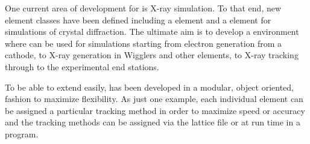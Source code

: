 One current area of development for \bmad is X-ray simulation. To that end, new element classes have
been defined including a  element and a  element for simulations of crystal
diffraction. The ultimate aim is to develop a environment where \bmad can be used for simulations
starting from electron generation from a cathode, to X-ray generation in Wigglers and other
elements, to X-ray tracking through to the experimental end stations.

To be able to extend \bmad easily, \bmad has been developed in a modular, object oriented, fashion
to maximize flexibility. As just one example, each individual element can be assigned a particular
tracking method in order to maximize speed or accuracy and the tracking methods can be assigned via
the lattice file or at run time in a program.

\vfill
\break
